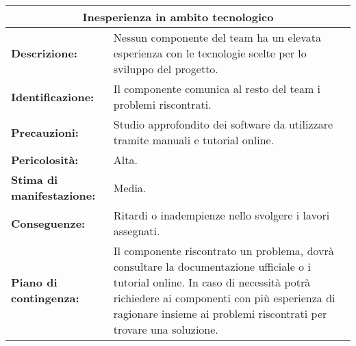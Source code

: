 \begin{tabular}{ |p{4cm}|p{10cm}|}
\hline
\multicolumn{2}{|c|}{\textbf{Inesperienza in ambito tecnologico}} \\
\hline
\textbf{Descrizione:}& Nessun componente del team ha un elevata esperienza con le tecnologie scelte per lo sviluppo del progetto.\\
\hline
\textbf{Identificazione:}& Il componente comunica al resto del team i problemi riscontrati.\\
\hline
\textbf{Precauzioni:}& Studio approfondito dei software da utilizzare tramite manuali e tutorial online.\\
\hline
\textbf{Pericolosità:}& Alta.\\
\hline
\textbf{Stima di manifestazione:}& Media.\\
\hline
\textbf{Conseguenze:}& Ritardi o inadempienze nello svolgere i lavori assegnati.\\
\hline
\textbf{Piano di contingenza:}& Il componente riscontrato un problema, dovrà consultare la documentazione ufficiale o i tutorial online. In caso di necessità potrà richiedere ai componenti con più esperienza di ragionare insieme ai problemi riscontrati per trovare una soluzione.\\
\hline
\end{tabular}

\vspace{20pt}

